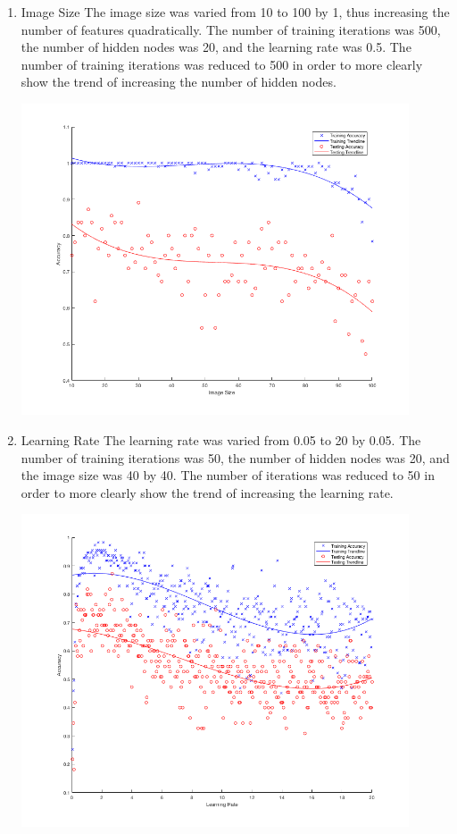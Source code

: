 \documentclass[12pt]{article}
\begin{document}
\begin{enumerate}
\begin{center}
    \label{fig:num_hidden_nodes}
  \end{center}
  \item Image Size
  The image size was varied from 10 to 100 by 1, thus increasing the number of features quadratically. The number of training iterations was 500, the number of hidden nodes was 20, and the learning rate was 0.5. The number of training iterations was reduced to 500 in order to more clearly show the trend of increasing the number of hidden nodes.
  \begin{center}
    \includegraphics[width=115mm]{./accuracy_imgs/img_size_empirical_500_iters.png}
    \label{fig:img_size}
  \end{center}
  \item Learning Rate
  The learning rate was varied from 0.05 to 20 by 0.05. The number of training iterations was 50, the number of hidden nodes was 20, and the image size was 40 by 40. The number of iterations was reduced to 50 in order to more clearly show the trend of increasing the learning rate.
  \begin{center}
    \includegraphics[width=115mm]{./accuracy_imgs/learning_rate_empirical_500_iters.png}

\end{center}
\end{enumerate}
\end{document}

